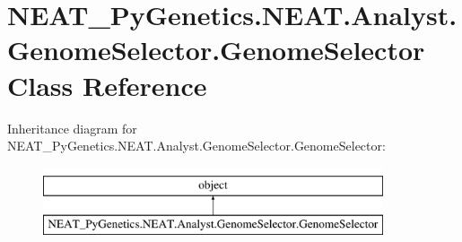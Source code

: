 \hypertarget{class_n_e_a_t___py_genetics_1_1_n_e_a_t_1_1_analyst_1_1_genome_selector_1_1_genome_selector}{}\section{N\+E\+A\+T\+\_\+\+Py\+Genetics.\+N\+E\+A\+T.\+Analyst.\+Genome\+Selector.\+Genome\+Selector Class Reference}
\label{class_n_e_a_t___py_genetics_1_1_n_e_a_t_1_1_analyst_1_1_genome_selector_1_1_genome_selector}
Inheritance diagram for N\+E\+A\+T\+\_\+\+Py\+Genetics.\+N\+E\+A\+T.\+Analyst.\+Genome\+Selector.\+Genome\+Selector\+:\begin{figure}[H]
\begin{center}
\leavevmode
\includegraphics[height=2.000000cm]{class_n_e_a_t___py_genetics_1_1_n_e_a_t_1_1_analyst_1_1_genome_selector_1_1_genome_selector}
\end{center}
\end{figure}
